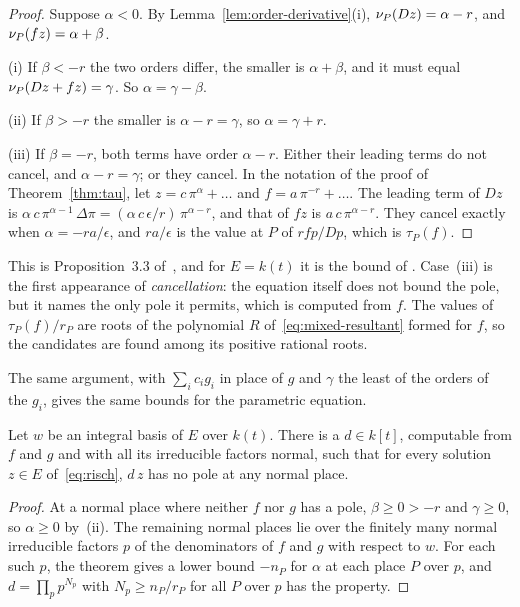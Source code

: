 \begin{proof}
Suppose $\alpha < 0$. By Lemma~\ref{lem:order-derivative}(i), $\nu_{P}(Dz) =
\alpha - r$, and $\nu_{P}(f z) = \alpha + \beta$.

(i) If $\beta < -r$ the two orders differ, the smaller is $\alpha + \beta$,
and it must equal $\nu_{P}(Dz + fz) = \gamma$. So $\alpha = \gamma - \beta$.

(ii) If $\beta > -r$ the smaller is $\alpha - r = \gamma$, so $\alpha = \gamma
+ r$.

(iii) If $\beta = -r$, both terms have order $\alpha - r$. Either their
leading terms do not cancel, and $\alpha - r = \gamma$; or they cancel. In
the notation of the proof of Theorem~\ref{thm:tau}, let $z = c\,\pi^\alpha +
\dots$ and $f = a\,\pi^{-r} + \dots$. The leading term of $Dz$ is $\alpha\,c\,
\pi^{\alpha - 1}\,\Delta\pi = (\alpha\,c\,\epsilon / r)\,\pi^{\alpha - r}$, and
that of $f z$ is $a\,c\,\pi^{\alpha - r}$. They cancel exactly when $\alpha =
-r a/\epsilon$, and $r a/\epsilon$ is the value at $P$ of $r f p/Dp$, which is
$\tau_P(f)$.
\end{proof}

This is Proposition~3.3 of~\cite{bronstein1990}, and for $E = k(t)$ it is
the bound of . Case~(iii) is the first appearance of
\emph{cancellation}: the equation itself does not bound the pole, but it
names the only pole it permits, which is computed from $f$. The values
of $\tau_P(f)/r_P$ are roots of the polynomial $R$
of~\eqref{eq:mixed-resultant} formed for $f$, so the candidates are found
among its positive rational roots.

The same argument, with $\sum_i c_i g_i$ in place of $g$ and $\gamma$ the
least of the orders of the $g_i$, gives the same bounds for the parametric
equation.

\begin{corollary}\label{cor:rde-denominator}
Let $w$ be an integral basis of $E$ over $k(t)$. There is a $d \in k[t]$,
computable from $f$ and $g$ and with all its irreducible factors normal, such
that for every solution $z \in E$ of~\eqref{eq:risch}, $d\,z$ has no pole at
any normal place.
\end{corollary}

\begin{proof}
At a normal place where neither $f$ nor $g$ has a pole, $\beta \ge 0 > -r$
and $\gamma \ge 0$, so $\alpha \ge 0$ by~(ii). The remaining normal places
lie over the finitely many normal irreducible factors $p$ of the
denominators of $f$ and $g$ with respect to $w$. For each such $p$, the
theorem gives a lower bound $-n_P$ for $\alpha$ at each place $P$ over $p$,
and $d = \prod_p p^{N_p}$ with $N_p \ge n_P / r_P$ for all $P$ over $p$ has
the property.
\end{proof}

